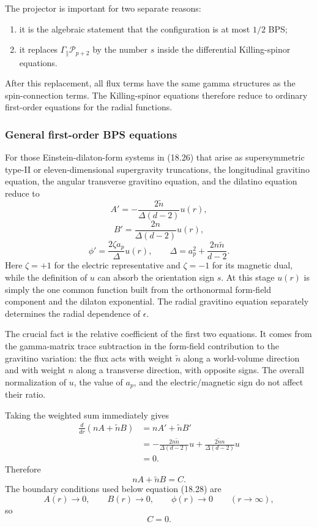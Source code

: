 \documentclass[
  10pt,
  a4paper,
  openany]{book}
\providecommand{\tightlist}{%
  \setlength{\itemsep}{0pt}\setlength{\parskip}{0pt}}
\begin{document}
The projector is important for two separate reasons:

\begin{enumerate}
\def\labelenumi{\arabic{enumi}.}
\tightlist
\item
  it is the algebraic statement that the configuration is at most
  \(1/2\) BPS;
\item
  it replaces \(\Gamma_\parallel\mathcal P_{p+2}\) by the number \(s\)
  inside the differential Killing-spinor equations.
\end{enumerate}

After this replacement, all flux terms have the same gamma structures as
the spin-connection terms. The Killing-spinor equations therefore reduce
to ordinary first-order equations for the radial functions.

\subsubsection{General first-order BPS
equations}\label{general-first-order-bps-equations}

For those Einstein-dilaton-form systems in (18.26) that arise as
supersymmetric type-II or eleven-dimensional supergravity truncations,
the longitudinal gravitino equation, the angular transverse gravitino
equation, and the dilatino equation reduce to \[
A'
=-\frac{2\tilde n}{\Delta(d-2)}u(r),
\] \[
B'
=\frac{2n}{\Delta(d-2)}u(r),
\] \[
\phi'
=\frac{2\zeta a_p}{\Delta}u(r),
\qquad
\Delta=a_p^2+\frac{2n\tilde n}{d-2}.
\] Here \(\zeta=+1\) for the electric representative and \(\zeta=-1\)
for its magnetic dual, while the definition of \(u\) can absorb the
orientation sign \(s\). At this stage \(u(r)\) is simply the one common
function built from the orthonormal form-field component and the dilaton
exponential. The radial gravitino equation separately determines the
radial dependence of \(\epsilon\).

The crucial fact is the relative coefficient of the first two equations.
It comes from the gamma-matrix trace subtraction in the form-field
contribution to the gravitino variation: the flux acts with weight
\(\tilde n\) along a world-volume direction and with weight \(n\) along
a transverse direction, with opposite signs. The overall normalization
of \(u\), the value of \(a_p\), and the electric/magnetic sign do not
affect their ratio.

Taking the weighted sum immediately gives \[
\begin{aligned}
\frac{d}{dr}\left(nA+\tilde nB\right)
&=nA'+\tilde nB'\\
&=-\frac{2n\tilde n}{\Delta(d-2)}u
+\frac{2\tilde n n}{\Delta(d-2)}u\\
&=0.
\end{aligned}
\] Therefore \[
\boxed{nA+\tilde nB=C}.
\] The boundary conditions used below equation (18.28) are \[
A(r)\to0,
\qquad
B(r)\to0,
\qquad
\phi(r)\to0
\qquad
(r\to\infty),
\] so \[
\boxed{C=0}.
\]
\end{document}
